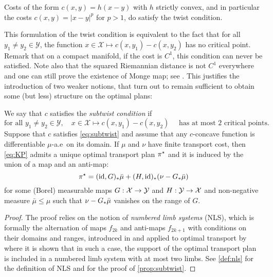         \begin{remark}
            Costs of the form $c(x,y)=h(x-y)$ with $h$ strictly convex, and in particular the costs $c(x,y)=|x-y|^p$ for $p>1$, do satisfy the twist condition.
        \end{remark}
        This formulation of the twist condition is equivalent to the fact that for all $y_1\neq y_2\in\mathcal Y$, the function $x\in\mathcal X\mapsto c(x,y_1)-c(x,y_2)$ has no critical point. Remark that on a compact manifold, if the cost is $C^1$, this condition can never be satisfied. Note also  that the squared Riemannian distance is not $C^1$ everywhere and one can still prove the existence of Monge map; see . This justifies the introduction of two weaker notions, that turn out to remain sufficient to obtain some (but less) structure  on the optimal plans:
        \begin{proposition}[Subtwist]
            \label{prop:subtwist}
            We say that $c$ satisfies the \emph{subtwist condition} if
            \begin{equation}
                \tag{Subtwist}
                \text{for all } y_1\neq y_2\in\mathcal Y,\quad x\in \mathcal X\mapsto c(x,y_1)-c(x,y_2)\quad \text{ has at most 2 critical points.}
                \label{eq:subtwist}
            \end{equation}
            Suppose that $c$ satisfies \cref{eq:subtwist} and assume that any $c$-concave function is differentiable $\mu$-a.e~on its domain. If $\mu$ and $\nu$ have finite transport cost, then \cref{eq:KP} admits a unique optimal transport plan $\pi^\star$ and it is induced by the union of a map and an anti-map:
            \begin{equation*}
                \pi^\star=(\operatorname{id} , G)_* \bar\mu+(H, \operatorname{id})_*(\nu-G_* \bar\mu)
            \end{equation*}
            for some (Borel) measurable maps $G:\mathcal{X}\to\mathcal{Y}$ and $H: \mathcal{Y}\to\mathcal{X}$ and non-negative measure $\bar\mu \leq \mu$ such that $\nu-G_* \bar\mu$ vanishes on the range of $G$.
        \end{proposition}
        \begin{proof}
            The proof relies on the notion of \emph{numbered limb systems} (NLS), which is formally the alternation of maps $f_{2k}$ and anti-maps $f_{2k+1}$ with conditions on their domains and ranges, introduced in \cite{hestir1995supports} and applied to optimal transport by \cite{ahmad2011optimal,chiappori2010hedonic} where it is shown that in such a case, the support of the optimal transport plan is included in a numbered limb system with at most two limbs. See \cref{def:nls} for the definition of NLS and \cite{ahmad2011optimal} for the proof of \cref{prop:subtwist}.
        \end{proof}
